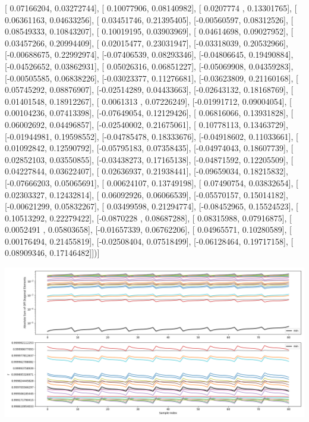 \documentclass{article}
\begin{document}
       [ 0.07166204,  0.03272744],
       [ 0.10077906,  0.08140982],
       [ 0.0207774 ,  0.13301765],
       [ 0.06361163,  0.04633256],
       [ 0.03451746,  0.21395405],
       [-0.00560597,  0.08312526],
       [ 0.08549333,  0.10843207],
       [ 0.10019195,  0.03903969],
       [ 0.04614698,  0.09027952],
       [ 0.03457266,  0.20994409],
       [ 0.02015477,  0.23031947],
       [-0.03318039,  0.20532966],
       [-0.00688675,  0.22992974],
       [-0.07406539,  0.08293346],
       [-0.04806645,  0.19490884],
       [-0.04526652,  0.03862931],
       [ 0.05026316,  0.06851227],
       [-0.05069908,  0.04359283],
       [-0.00505585,  0.06838226],
       [-0.03023377,  0.11276681],
       [-0.03623809,  0.21160168],
       [ 0.05745292,  0.08876907],
       [-0.02514289,  0.04433663],
       [-0.02643132,  0.18168769],
       [ 0.01401548,  0.18912267],
       [ 0.0061313 ,  0.07226249],
       [-0.01991712,  0.09004054],
       [ 0.00104236,  0.07413398],
       [-0.07649054,  0.12129426],
       [ 0.06816066,  0.13931828],
       [ 0.06002692,  0.04496857],
       [-0.02540002,  0.21675061],
       [ 0.10778113,  0.13463729],
       [-0.01944981,  0.19598552],
       [-0.04785478,  0.18333676],
       [-0.04918602,  0.11033661],
       [ 0.01092842,  0.12590792],
       [-0.05795183,  0.07358435],
       [-0.04974043,  0.18607739],
       [ 0.02852103,  0.03550855],
       [-0.03438273,  0.17165138],
       [-0.04871592,  0.12205509],
       [ 0.04227844,  0.03622407],
       [ 0.02636937,  0.21938441],
       [-0.09659034,  0.18215832],
       [-0.07666203,  0.05065691],
       [ 0.00624107,  0.13749198],
       [ 0.07490754,  0.03832654],
       [ 0.02303327,  0.12432814],
       [ 0.06092926,  0.06066539],
       [-0.05570157,  0.15014182],
       [-0.00621299,  0.05832267],
       [ 0.03499598,  0.21294774],
       [-0.08452965,  0.15524523],
       [ 0.10513292,  0.22279422],
       [-0.0870228 ,  0.08687288],
       [ 0.08315988,  0.07916875],
       [ 0.0052491 ,  0.05803658],
       [-0.01657339,  0.06762206],
       [ 0.04965571,  0.10280589],
       [ 0.00176494,  0.21455819],
       [-0.02508404,  0.07518499],
       [-0.06128464,  0.19717158],
       [ 0.08909346,  0.17146482]])]
\begin{center}
\includegraphics[scale=.9]{report_pickled_controls176/control_dpn_all.png}

\end{center}
\end{document}

